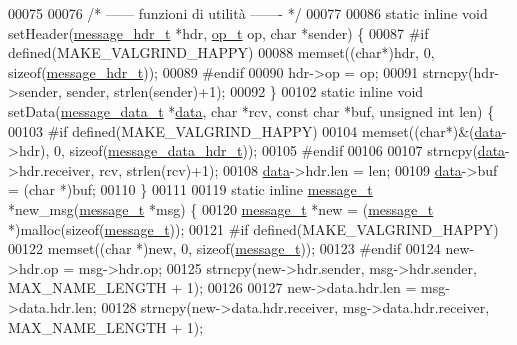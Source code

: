 \begin{DoxyCode}
00075 
00076 \textcolor{comment}{/* ------ funzioni di utilità ------- */}
00077 
00086 \textcolor{keyword}{static} \textcolor{keyword}{inline} \textcolor{keywordtype}{void} setHeader(\mbox{\hyperlink{structmessage__hdr__t}{message\_hdr\_t}} *hdr, \mbox{\hyperlink{ops_8h_ac6fa1b34da8872e34c2936391332f44c}{op\_t}} op, \textcolor{keywordtype}{char} *sender) \{
00087 \textcolor{preprocessor}{#if defined(MAKE\_VALGRIND\_HAPPY)}
00088         memset((\textcolor{keywordtype}{char}*)hdr, 0, \textcolor{keyword}{sizeof}(\mbox{\hyperlink{structmessage__hdr__t}{message\_hdr\_t}}));
00089 \textcolor{preprocessor}{#endif}
00090         hdr->op  = op;
00091         strncpy(hdr->sender, sender, strlen(sender)+1);
00092 \}
00102 \textcolor{keyword}{static} \textcolor{keyword}{inline} \textcolor{keywordtype}{void} setData(\mbox{\hyperlink{structmessage__data__t}{message\_data\_t}} *\mbox{\hyperlink{structdata}{data}}, \textcolor{keywordtype}{char} *rcv, \textcolor{keyword}{const} \textcolor{keywordtype}{char} *buf, \textcolor{keywordtype}{unsigned} \textcolor{keywordtype}{int}
       len) \{
00103 \textcolor{preprocessor}{#if defined(MAKE\_VALGRIND\_HAPPY)}
00104         memset((\textcolor{keywordtype}{char}*)&(\mbox{\hyperlink{structdata}{data}}->hdr), 0, \textcolor{keyword}{sizeof}(\mbox{\hyperlink{structmessage__data__hdr__t}{message\_data\_hdr\_t}}));
00105 \textcolor{preprocessor}{#endif}
00106 
00107         strncpy(\mbox{\hyperlink{structdata}{data}}->hdr.receiver, rcv, strlen(rcv)+1);
00108         \mbox{\hyperlink{structdata}{data}}->hdr.len  = len;
00109         \mbox{\hyperlink{structdata}{data}}->buf      = (\textcolor{keywordtype}{char} *)buf;
00110 \}
00111 
00119 \textcolor{keyword}{static} \textcolor{keyword}{inline} \mbox{\hyperlink{structmessage__t}{message\_t}} *new\_msg(\mbox{\hyperlink{structmessage__t}{message\_t}} *msg) \{
00120         \mbox{\hyperlink{structmessage__t}{message\_t}} *\textcolor{keyword}{new} = (\mbox{\hyperlink{structmessage__t}{message\_t}} *)malloc(\textcolor{keyword}{sizeof}(\mbox{\hyperlink{structmessage__t}{message\_t}}));
00121 \textcolor{preprocessor}{   #if defined(MAKE\_VALGRIND\_HAPPY)}
00122         memset((\textcolor{keywordtype}{char} *)\textcolor{keyword}{new}, 0, \textcolor{keyword}{sizeof}(\mbox{\hyperlink{structmessage__t}{message\_t}}));
00123 \textcolor{preprocessor}{   #endif}
00124         \textcolor{keyword}{new}->hdr.op = msg->hdr.op;
00125         strncpy(new->hdr.sender, msg->hdr.sender, MAX\_NAME\_LENGTH + 1);
00126 
00127         \textcolor{keyword}{new}->data.hdr.len = msg->data.hdr.len;
00128         strncpy(new->data.hdr.receiver, msg->data.hdr.receiver, MAX\_NAME\_LENGTH + 1);

\end{DoxyCode}
